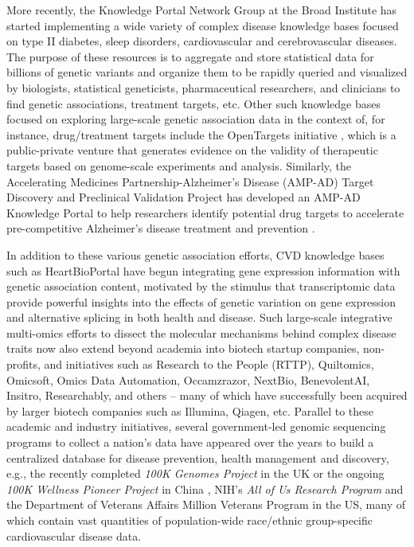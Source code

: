 \documentclass[letter]{bioinfo}
\begin{document}
More recently, the Knowledge Portal Network Group at the Broad Institute has started implementing a wide variety of complex disease knowledge bases focused on type II diabetes, sleep disorders, cardiovascular and cerebrovascular diseases.  The purpose of these resources is to aggregate and store statistical data for billions of genetic variants and organize them to be rapidly queried and visualized by biologists, statistical geneticists, pharmaceutical researchers, and clinicians to find genetic associations, treatment targets, etc.  Other such knowledge bases focused on exploring large-scale genetic association data in the context of, for instance, drug/treatment targets include the OpenTargets initiative \citep{Koscielny:2017:Open}, which is a public-private venture that generates evidence on the validity of therapeutic targets based on genome-scale experiments and analysis.  Similarly, the Accelerating Medicines Partnership-Alzheimer's Disease (AMP-AD) Target Discovery and Preclinical Validation Project has developed an AMP-AD Knowledge Portal to help researchers identify potential drug targets to accelerate pre-competitive Alzheimer's disease treatment and prevention \citep{NIA:2015:AMP}.  
	
	In addition to these various genetic association efforts, CVD knowledge bases such as HeartBioPortal \citep{Khomtchouk:2018:HeartBioPortal} have begun integrating gene expression information with genetic association content, motivated by the stimulus that transcriptomic data provide powerful insights into the effects of genetic variation on gene expression and alternative splicing in both health and disease.  Such large-scale integrative multi-omics efforts to dissect the molecular mechanisms behind complex disease traits now also extend beyond academia into biotech startup companies, non-profits, and initiatives such as Research to the People (RTTP), Quiltomics, Omicsoft, Omics Data Automation, Occamzrazor, NextBio, BenevolentAI, Insitro, Researchably, and others -- many of which have successfully been acquired by larger biotech companies such as Illumina, Qiagen, etc.  Parallel to these academic and industry initiatives, several government-led genomic sequencing programs to collect a nation's data have appeared over the years to build a centralized database for disease prevention, health management and discovery, e.g., the recently completed \textit{100K Genomes Project} in the UK \citep{Caulfield:2017:100K} or the ongoing \textit{100K Wellness Pioneer Project} in China \citep{Kalia:2017:China}, NIH's \textit{All of Us Research Program} \citep{NIH:2018:All} and the Department of Veterans Affairs Million Veterans Program \citep{Gaziano:2016:Million} in the US, many of which contain vast quantities of population-wide race/ethnic group-specific cardiovascular disease data.  
\end{document}

